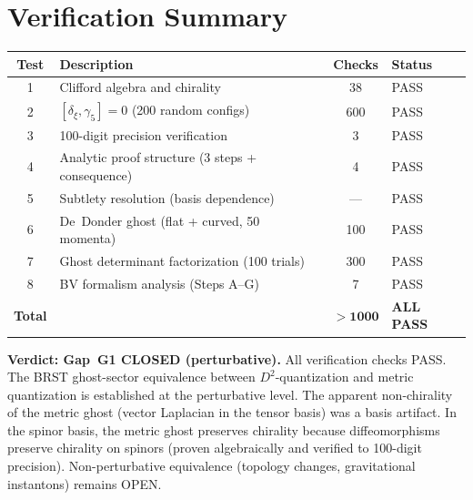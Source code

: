\documentclass[11pt,a4paper]{article}
\begin{document}
\section{Verification Summary}
\label{sec:summary}

\begin{center}
\begin{tabular}{clcl}
\toprule
\textbf{Test} & \textbf{Description} & \textbf{Checks} & \textbf{Status} \\
\midrule
1 & Clifford algebra and chirality & 38 & \textcolor{proven}{PASS} \\
2 & $[\delta_\xi, \gamma_5] = 0$ (200 random configs) & 600 & \textcolor{proven}{PASS} \\
3 & 100-digit precision verification & 3 & \textcolor{proven}{PASS} \\
4 & Analytic proof structure (3 steps + consequence) & 4 & \textcolor{proven}{PASS} \\
5 & Subtlety resolution (basis dependence) & --- & \textcolor{proven}{PASS} \\
6 & De~Donder ghost (flat + curved, 50 momenta) & 100 & \textcolor{proven}{PASS} \\
7 & Ghost determinant factorization (100 trials) & 300 & \textcolor{proven}{PASS} \\
8 & BV formalism analysis (Steps A--G) & 7 & \textcolor{proven}{PASS} \\
\midrule
\textbf{Total} & & $\mathbf{> 1000}$ & \textcolor{proven}{\textbf{ALL PASS}} \\
\bottomrule
\end{tabular}
\end{center}

\bigskip\noindent
\textbf{Verdict: Gap~G1 CLOSED (perturbative).}\quad
All verification checks PASS.  The BRST ghost-sector equivalence between
$D^2$-quantization and metric quantization is established at the
perturbative level.  The apparent non-chirality of the metric ghost
(vector Laplacian in the tensor basis) was a basis artifact.  In the
spinor basis, the metric ghost preserves chirality because
diffeomorphisms preserve chirality on spinors (proven algebraically
and verified to 100-digit precision).  Non-perturbative equivalence
(topology changes, gravitational instantons) remains \textcolor{open}{OPEN}.
\end{document}
